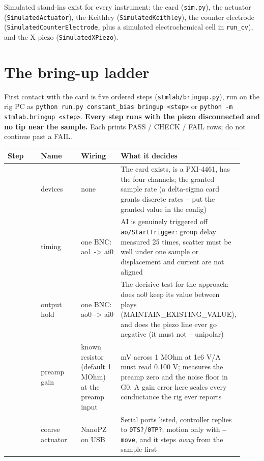 Simulated stand-ins exist for every instrument: the card (\texttt{sim.\discretionary{}{}{}py}), the actuator (\texttt{Simulated\discretionary{}{}{}Actuator}), the Keithley (\texttt{Simulated\discretionary{}{}{}Keithley}), the counter electrode (\texttt{Simulated\discretionary{}{}{}Counter\discretionary{}{}{}Electrode}, plus a simulated electrochemical cell in \texttt{run\_\discretionary{}{}{}cv}), and the X piezo (\texttt{Simulated\discretionary{}{}{}XPiezo}).

\section{The bring-up ladder}

First contact with the card is five ordered steps (\texttt{stmlab/\discretionary{}{}{}bringup.\discretionary{}{}{}py}), run on the rig PC as \texttt{python run.\discretionary{}{}{}py constant\_\discretionary{}{}{}bias bringup <step>} or \texttt{python -m stmlab.\discretionary{}{}{}bringup <step>}. \textbf{Every step runs with the piezo disconnected and no tip near the sample.} Each prints PASS / CHECK / FAIL rows; do not continue past a FAIL.

\small\setlength{\LTleft}{0pt}\setlength{\LTright}{\fill}
\begin{longtable}{@{}>{\raggedright\arraybackslash}p{0.230\linewidth}>{\raggedright\arraybackslash}p{0.230\linewidth}>{\raggedright\arraybackslash}p{0.230\linewidth}>{\raggedright\arraybackslash}p{0.230\linewidth}@{}}
\toprule
\textbf{Step} & \textbf{Name} & \textbf{Wiring} & \textbf{What it decides} \\
\midrule\endhead
1 & devices & none & The card exists, is a PXI-4461, has the four channels; the granted sample rate (a delta-sigma card grants discrete rates -- put the granted value in the config) \\
2 & timing & one BNC: ao1 -> ai0 & AI is genuinely triggered off \texttt{ao/\discretionary{}{}{}Start\discretionary{}{}{}Trigger}: group delay measured 25 times, scatter must be well under one sample or displacement and current are not aligned \\
3 & output hold & one BNC: ao0 -> ai0 & The decisive test for the approach: does ao0 keep its value between plays (MAINTAIN\_EXISTING\_VALUE), and does the piezo line ever go negative (it must not -- unipolar) \\
4 & preamp gain & known resistor (default 1 MOhm) at the preamp input & 100 mV across 1 MOhm at 1e6 V/A must read 0.100 V; measures the preamp zero and the noise floor in G0. A gain error here scales every conductance the rig ever reports \\
5 & coarse actuator & NanoPZ on USB & Serial ports listed, controller replies to \texttt{0TS?}/\texttt{0TP?}; motion only with \texttt{--move}, and it steps \emph{away} from the sample first \\
\bottomrule
\end{longtable}
\normalsize

